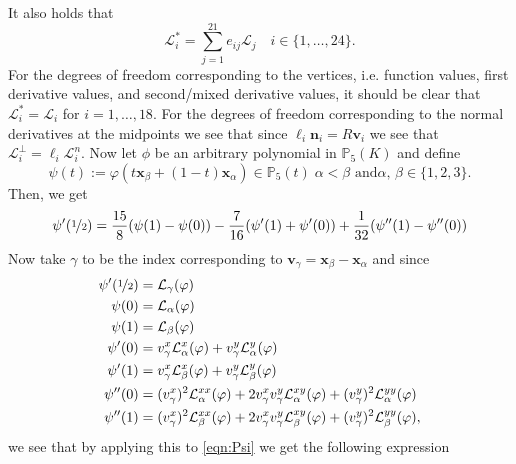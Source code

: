 It also holds that
\begin{equation}
  \mathcal{L}^*_i = \sum_{j=1}^{21} e_{ij} \mathcal{L}_j \quad i\in
  \{1,\dots,24\}.
  \label{eqn:FunctionalsE}
\end{equation}
For the degrees of freedom corresponding to the vertices, i.e. function values,
first derivative values, and second/mixed derivative values, it should be clear
that $\mathcal{L}^*_i = \mathcal{L}_i$ for $i=1,\dots,18$. For the degrees of
freedom corresponding to the normal derivatives at the midpoints we see that
since $\ell_i \mathbf{n}_i = R \mathbf{v}_i$ we see that $\mathcal{L}^{\perp}_i
= \ell_i \mathcal{L}^n_i$. Now let $\phi$ be an arbitrary polynomial in
$\mathbb{P}_5(K)$ and define
\begin{equation*}
  \psi(t) := \varphi(t\mathbf{x}_{\beta} + (1-t)\mathbf{x}_{\alpha}) \in
  \mathbb{P}_5(t) \; \alpha<\beta \text{ and} \alpha,\,\beta \in \{1,2,3\}.
\end{equation*}
Then, we get
\begin{equation}
  \psi'(\nicefrac{1}{2}) = \frac{15}{8} (\psi(1)-\psi(0)) -
  \frac{7}{16} (\psi'(1)+\psi'(0)) + \frac{1}{32} (\psi''(1)-\psi''(0))
  \label{eqn:Psi}
\end{equation}
Now take $\gamma$ to be the index corresponding to $\mathbf{v}_{\gamma} =
\mathbf{x}_{\beta} - \mathbf{x}_{\alpha}$ and since
\begin{align*}
  \psi'(\nicefrac{1}{2}) &= \mathcal{L}_{\gamma}(\varphi) \\
  \psi(0) &= \mathcal{L}_{\alpha}(\varphi) \\
  \psi(1) &= \mathcal{L}_{\beta}(\varphi) \\
  \psi'(0) &= v^x_{\gamma}\mathcal{L}^x_{\alpha}(\varphi) +
    v^y_{\gamma}\mathcal{L}^y_{\alpha}(\varphi) \\
  \psi'(1) &= v^x_{\gamma}\mathcal{L}^x_{\beta}(\varphi) +
    v^y_{\gamma}\mathcal{L}^y_{\beta}(\varphi) \\
  \psi''(0) &= (v^x_{\gamma})^2\mathcal{L}^{xx}_{\alpha}(\varphi) +
    2 v^x_{\gamma}v^y_{\gamma}\mathcal{L}^{xy}_{\alpha}(\varphi) +
    (v^y_{\gamma})^2\mathcal{L}^{yy}_{\alpha}(\varphi) \\
  \psi''(1) &= (v^x_{\gamma})^2\mathcal{L}^{xx}_{\beta}(\varphi) +
    2 v^x_{\gamma}v^y_{\gamma}\mathcal{L}^{xy}_{\beta}(\varphi) +
    (v^y_{\gamma})^2\mathcal{L}^{yy}_{\beta}(\varphi),
\end{align*}
we see that by applying this to \eqref{eqn:Psi} we get the following expression
